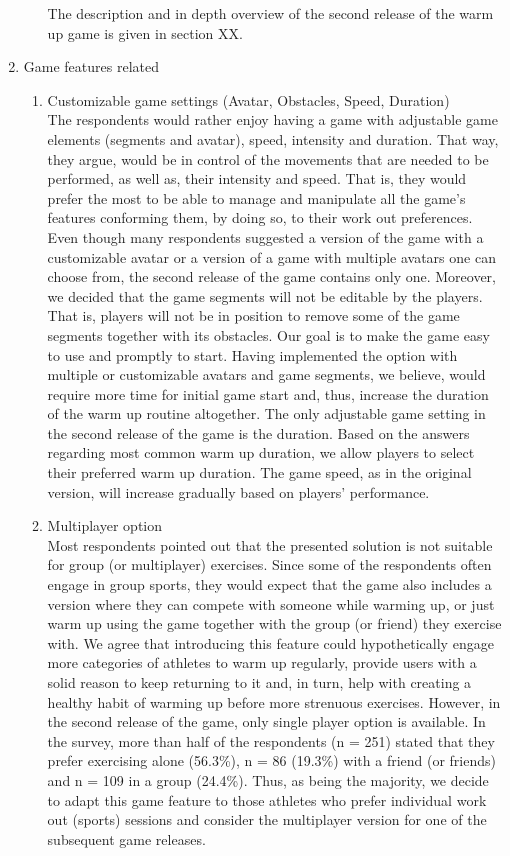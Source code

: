 \begin{enumerate}
\begin{enumerate}
The description and in depth overview of the second release of the warm up game is given in section XX.
	\end{enumerate}
\item Game features related
\begin{enumerate}
	\item Customizable game settings (Avatar, Obstacles, Speed, Duration)\\
The respondents would rather enjoy having a game with adjustable game elements (segments and avatar), speed, intensity and duration. That way, they argue, would be in control of the movements that are needed to be performed, as well as, their intensity and speed. That is, they would prefer the most to be able to manage and manipulate all the game's features conforming them, by doing so, to their work out preferences. Even though many respondents suggested a version of the game with a customizable avatar or a version of a game with multiple avatars one can choose from, the second release of the game contains only one. Moreover, we decided that the game segments will not be editable by the players. That is, players will not be in position to remove some of the game segments together with its obstacles. Our goal is to make the game easy to use and promptly to start. Having implemented the option with multiple or customizable avatars and game segments, we believe, would require more time for initial game start and, thus, increase the duration of the warm up routine altogether. The only adjustable game setting in the second release of the game is the duration. Based on the answers regarding most common warm up duration, we allow players to select their preferred warm up duration. The game speed, as in the original version, will increase gradually based on players' performance.  
\item Multiplayer option\\
Most respondents pointed out that the presented solution is not suitable for group (or multiplayer) exercises. Since some of the respondents often engage in group sports, they would expect that the game also includes a version where they can compete with someone while warming up, or just warm up using the game together with the group (or friend) they exercise with. We agree that introducing this feature could hypothetically engage more categories of athletes to warm up regularly, provide users with a solid reason to keep returning to it and, in turn, help with creating a healthy habit of warming up before more strenuous exercises. However, in the second release of the game, only single player option is available. In the survey, more than half of the respondents (n = 251) stated that they prefer exercising alone (56.3\%), n = 86 (19.3\%) with a friend (or friends) and n = 109 in a group (24.4\%). Thus, as being the majority, we decide to adapt this game feature to those athletes who prefer individual work out (sports) sessions and consider the multiplayer version for one of the subsequent game releases. 

\end{enumerate}
\end{enumerate}
